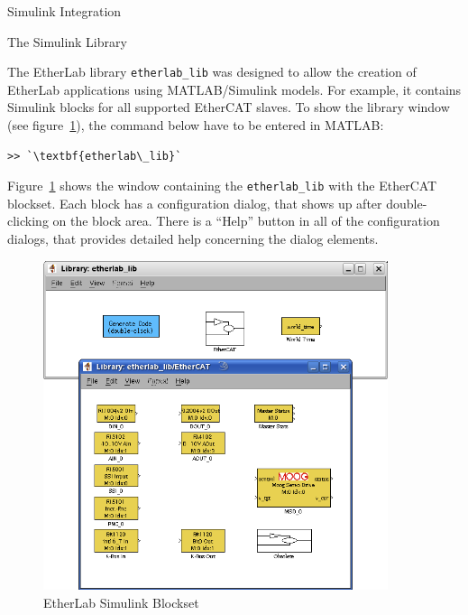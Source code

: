 \begin{ighsec}{Simulink Integration}
\label{sec:simulink}


\begin{ighsec}{The Simulink Library}
\label{sec:lib}

The EtherLab library \texttt{etherlab\_lib} was designed to allow the creation
of EtherLab applications using MATLAB/Simulink models. For example, it
contains Simulink blocks for all supported EtherCAT slaves. To show the
library window (see figure~\ref{fig:blockset}), the command below have to be
entered in MATLAB:

\begin{lstlisting}[gobble=2]
  >> `\textbf{etherlab\_lib}`
\end{lstlisting}

Figure~\ref{fig:blockset} shows the window containing the
\texttt{etherlab\_lib} with the EtherCAT blockset. Each block has a
configuration dialog, that shows up after double-clicking on the block area.
There is a ``Help'' button in all of the configuration dialogs, that provides
detailed help concerning the dialog elements.

\begin{figure}[H]
  \begin{center}
    \includegraphics[width=0.9\textwidth]{images/blockset.png}
    \caption{EtherLab Simulink Blockset}
    \label{fig:blockset}
  \end{center}
\end{figure}


\end{ighsec}
\end{ighsec}
